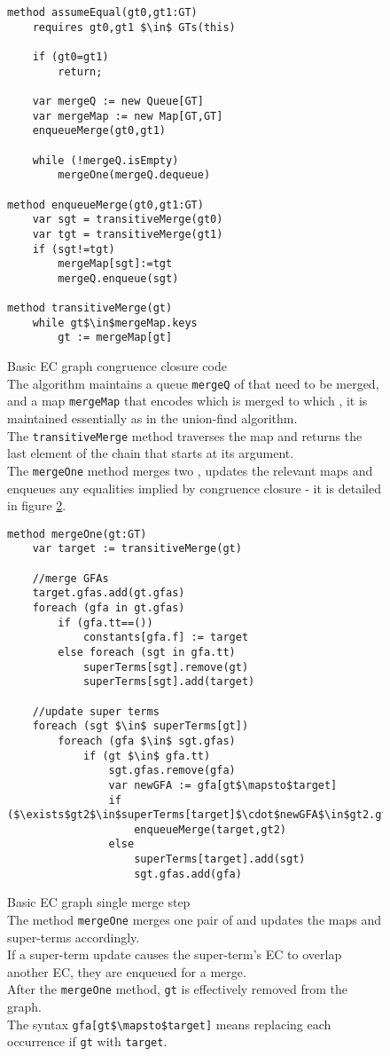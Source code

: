 \begin{figure}
\begin{lstlisting}
method assumeEqual(gt0,gt1:GT)
	requires gt0,gt1 $\in$ GTs(this)
	
	if (gt0=gt1)
		return;
	
	var mergeQ := new Queue[GT]
	var mergeMap := new Map[GT,GT]
	enqueueMerge(gt0,gt1)
	
	while (!mergeQ.isEmpty)
		mergeOne(mergeQ.dequeue)
		
method enqueueMerge(gt0,gt1:GT)
	var sgt = transitiveMerge(gt0)
	var tgt = transitiveMerge(gt1)
	if (sgt!=tgt)
		mergeMap[sgt]:=tgt
		mergeQ.enqueue(sgt)
		
method transitiveMerge(gt)
	while gt$\in$mergeMap.keys
		gt := mergeMap[gt]
\end{lstlisting}
\caption{Basic EC graph congruence closure code\\
The algorithm maintains a queue \lstinline|mergeQ| of \GTs{} that need to be merged,\\
and a map \lstinline|mergeMap| that encodes which \GT{} is merged to which \GT{}, 
it is maintained essentially as in the union-find algorithm.\\
The \lstinline|transitiveMerge| method traverses the map and returns the last element of the chain that starts at its argument.\\
The \lstinline|mergeOne| method merges two \GTs{}, updates the relevant maps and enqueues any equalities implied by congruence closure - it is detailed in figure \ref{fig_basic_ECGraph_mergeOne}.
}
\label{fig_basic_ECGraph_assumeEqual}
\end{figure}
\begin{figure}
\begin{lstlisting}
method mergeOne(gt:GT)
	var target := transitiveMerge(gt)
	
	//merge GFAs
	target.gfas.add(gt.gfas)
	foreach (gfa in gt.gfas)
		if (gfa.tt==())
			constants[gfa.f] := target
		else foreach (sgt in gfa.tt)
			superTerms[sgt].remove(gt)
			superTerms[sgt].add(target)
			
	//update super terms
	foreach (sgt $\in$ superTerms[gt])
		foreach (gfa $\in$ sgt.gfas)
			if (gt $\in$ gfa.tt)
				sgt.gfas.remove(gfa)
				var newGFA := gfa[gt$\mapsto$target]
				if ($\exists$gt2$\in$superTerms[target]$\cdot$newGFA$\in$gt2.gfas)
					enqueueMerge(target,gt2)
				else
					superTerms[target].add(sgt)
					sgt.gfas.add(gfa)
\end{lstlisting}
\caption{Basic EC graph single merge step\\
The method \lstinline|mergeOne| merges one pair of \GTs{} and updates the maps and super-terms accordingly.\\
If a super-term update causes the super-term's EC to overlap another EC, they are enqueued for a merge.\\
After the \lstinline|mergeOne| method, \lstinline|gt| is effectively removed from the graph.\\
The syntax \lstinline|gfa[gt$\mapsto$target]| means replacing each occurrence if \lstinline|gt| with \lstinline|target|.
}
\label{fig_basic_ECGraph_mergeOne}
\end{figure}

